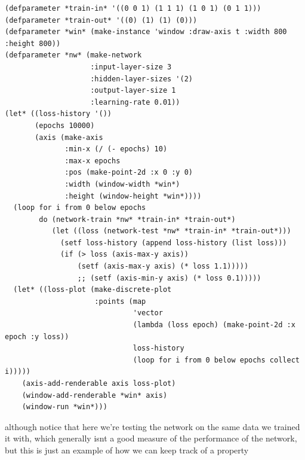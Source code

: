 \documentclass[a4paper,12pt]{article}
\begin{document}
\begin{lstlisting}
(defparameter *train-in* '((0 0 1) (1 1 1) (1 0 1) (0 1 1)))
(defparameter *train-out* '((0) (1) (1) (0)))
(defparameter *win* (make-instance 'window :draw-axis t :width 800 :height 800))
(defparameter *nw* (make-network
                    :input-layer-size 3
                    :hidden-layer-sizes '(2)
                    :output-layer-size 1
                    :learning-rate 0.01))
(let* ((loss-history '())
       (epochs 10000)
       (axis (make-axis
              :min-x (/ (- epochs) 10)
              :max-x epochs
              :pos (make-point-2d :x 0 :y 0)
              :width (window-width *win*)
              :height (window-height *win*))))
  (loop for i from 0 below epochs
        do (network-train *nw* *train-in* *train-out*)
           (let ((loss (network-test *nw* *train-in* *train-out*)))
             (setf loss-history (append loss-history (list loss)))
             (if (> loss (axis-max-y axis))
                 (setf (axis-max-y axis) (* loss 1.1)))))
                 ;; (setf (axis-min-y axis) (* loss 0.1)))))
  (let* ((loss-plot (make-discrete-plot
                     :points (map
                              'vector
                              (lambda (loss epoch) (make-point-2d :x epoch :y loss))
                              loss-history
                              (loop for i from 0 below epochs collect i)))))
    (axis-add-renderable axis loss-plot)
    (window-add-renderable *win* axis)
    (window-run *win*)))
\end{lstlisting}
although notice that here we're testing the network on the same data we trained it with, which generally isnt a good measure of the performance of the network, but this is just an example of how we can keep track of a property
\end{document}
